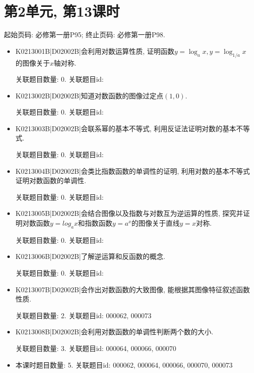 \section*{第2单元, 第13课时}
起始页码: 必修第一册P95; 终止页码: 必修第一册P98.
\begin{itemize}
\item K0213001B|D02002B|会利用对数运算性质, 证明函数$y=\log_ax,y=\log_{1/a}x$的图像关于$x$轴对称.

关联题目数量: 0. 关联题目id: 

\item K0213002B|D02002B|知道对数函数的图像过定点$(1,0)$.

关联题目数量: 0. 关联题目id: 

\item K0213003B|D02002B|会联系幂的基本不等式, 利用反证法证明对数的基本不等式.

关联题目数量: 0. 关联题目id: 

\item K0213004B|D02002B|会类比指数函数的单调性的证明, 利用对数的基本不等式证明对数函数的单调性.

关联题目数量: 0. 关联题目id: 

\item K0213005B|D02002B|会结合图像以及指数与对数互为逆运算的性质, 探究并证明对数函数$y=log_ax$和指数函数$y=a^{x}$的图像关于直线$y=x$对称.

关联题目数量: 0. 关联题目id: 

\item K0213006B|D02002B|了解逆运算和反函数的概念.

关联题目数量: 0. 关联题目id: 

\item K0213007B|D02002B|会作出对数函数的大致图像, 能根据其图像特征叙述函数性质.

关联题目数量: 2. 关联题目id: 000062, 000073

\item K0213008B|D02002B|会利用对数函数的单调性判断两个数的大小.

关联题目数量: 3. 关联题目id: 000064, 000066, 000070

\item 本课时题目数量: 5. 关联题目id: 000062, 000064, 000066, 000070, 000073

\end{itemize}


